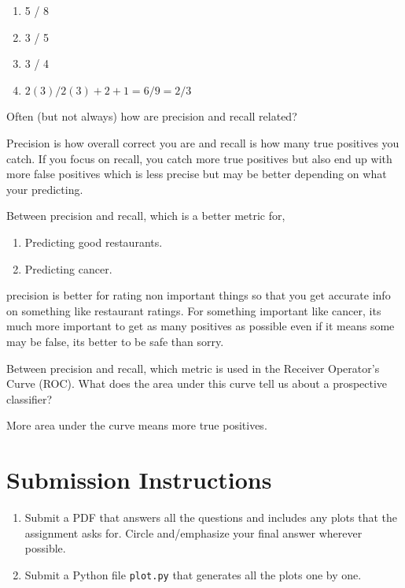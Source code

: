\documentclass{homework}
\begin{document}
\begin{sol}
  \begin{enumerate}
    \item 5 / 8 
    \item 3 / 5 
    \item 3 / 4
    \item $2(3) / 2(3) + 2 + 1 = 6 / 9 = 2 / 3$
  \end{enumerate}
\end{sol}

\question Often (but not always) how are precision and recall related?

\begin{sol}
  Precision is how overall correct you are and recall is how many true positives you catch. If you focus on recall, you catch more true positives but also end up with more false positives which is less precise but may be better depending on what your predicting.
\end{sol}

\question Between precision and recall, which is a better metric for,
\begin{enumerate}
  \item Predicting good restaurants.
  \item Predicting cancer.
\end{enumerate}

\begin{sol}
  precision is better for rating non important things so that you get accurate info on something like restaurant ratings. For something important like cancer, its much more important to get as many positives as possible even if it means some may be false, its better to be safe than sorry.
\end{sol}

\question Between precision and recall, which metric is used in the Receiver Operator's Curve (ROC). What does the area under this curve tell us about a prospective classifier?

\begin{sol}
  More area under the curve means more true positives.
\end{sol}

\section*{Submission Instructions}

\begin{enumerate}
  \item Submit a PDF that answers all the questions and includes any plots that the assignment asks for. Circle and/emphasize your final answer wherever possible.
  \item Submit a Python file \eg \texttt{plot.py} that generates all the plots one by one.
\end{enumerate}
\end{document}
